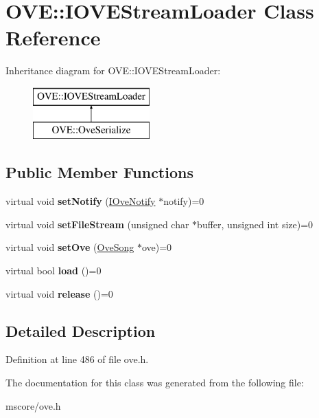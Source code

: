 \hypertarget{class_o_v_e_1_1_i_o_v_e_stream_loader}{}\section{O\+VE\+:\+:I\+O\+V\+E\+Stream\+Loader Class Reference}
\label{class_o_v_e_1_1_i_o_v_e_stream_loader}
Inheritance diagram for O\+VE\+:\+:I\+O\+V\+E\+Stream\+Loader\+:\begin{figure}[H]
\begin{center}
\leavevmode
\includegraphics[height=2.000000cm]{class_o_v_e_1_1_i_o_v_e_stream_loader}
\end{center}
\end{figure}
\subsection*{Public Member Functions}
\begin{DoxyCompactItemize}
\item 
\mbox{\label{class_o_v_e_1_1_i_o_v_e_stream_loader_aba94041c8bc9f05223cabf8d555f09cb}} 
virtual void {\bfseries set\+Notify} (\hyperlink{class_o_v_e_1_1_i_ove_notify}{I\+Ove\+Notify} $\ast$notify)=0
\item 
\mbox{\label{class_o_v_e_1_1_i_o_v_e_stream_loader_a99ef64d3ba896cfca0200b90c30cf1f5}} 
virtual void {\bfseries set\+File\+Stream} (unsigned char $\ast$buffer, unsigned int size)=0
\item 
\mbox{\label{class_o_v_e_1_1_i_o_v_e_stream_loader_ac3f3f10320909f2190aa2357f916a822}} 
virtual void {\bfseries set\+Ove} (\hyperlink{class_o_v_e_1_1_ove_song}{Ove\+Song} $\ast$ove)=0
\item 
\mbox{\label{class_o_v_e_1_1_i_o_v_e_stream_loader_a70ee99938c37596bc88d3ebf9c271e6e}} 
virtual bool {\bfseries load} ()=0
\item 
\mbox{\label{class_o_v_e_1_1_i_o_v_e_stream_loader_a17efc654a9a2086ff0ca0fe671f21272}} 
virtual void {\bfseries release} ()=0
\end{DoxyCompactItemize}


\subsection{Detailed Description}


Definition at line 486 of file ove.\+h.



The documentation for this class was generated from the following file\+:\begin{DoxyCompactItemize}
\item 
mscore/ove.\+h\end{DoxyCompactItemize}
